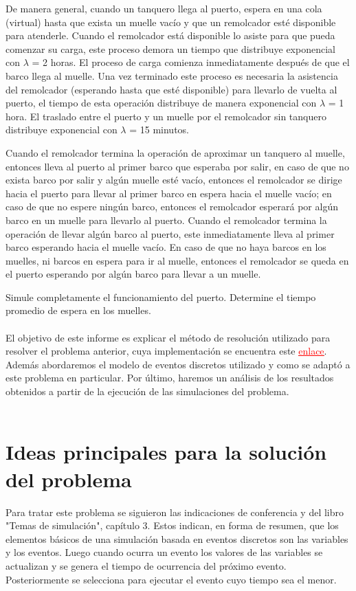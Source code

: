 \documentclass[twoside]{article}
\begin{document}
De manera general, cuando un tanquero llega al puerto, espera en una cola
(virtual) hasta que exista un muelle vac\'io y que un remolcador est\'e disponible
para atenderle. Cuando el remolcador est\'a disponible lo asiste para que pueda
comenzar su carga, este proceso demora un tiempo que distribuye exponencial
con $\lambda$ = 2 horas. El proceso de carga comienza inmediatamente despu\'es de que
el barco llega al muelle. Una vez terminado este proceso es necesaria la asistencia
del remolcador (esperando hasta que est\'e disponible) para llevarlo de vuelta al
puerto, el tiempo de esta operaci\'on distribuye de manera exponencial con $\lambda$ = 1
hora. El traslado entre el puerto y un muelle por el remolcador sin tanquero
distribuye exponencial con $\lambda$ = 15 minutos.

Cuando el remolcador termina la operaci\'on de aproximar un tanquero al
muelle, entonces lleva al puerto al primer barco que esperaba por salir, en caso de
que no exista barco por salir y alg\'un muelle est\'e vac\'io, entonces el remolcador se
dirige hacia el puerto para llevar al primer barco en espera hacia el muelle vac\'io;
en caso de que no espere ning\'un barco, entonces el remolcador esperar\'a por alg\'un barco en un muelle para llevarlo al puerto. Cuando el remolcador termina
la operaci\'on de llevar alg\'un barco al puerto, este inmediatamente lleva al primer
barco esperando hacia el muelle vac\'io. En caso de que no haya barcos en los
muelles, ni barcos en espera para ir al muelle, entonces el remolcador se queda
en el puerto esperando por alg\'un barco para llevar a un muelle.

Simule completamente el funcionamiento del puerto. Determine el tiempo
promedio de espera en los muelles. \\\\

El objetivo de este informe es explicar el m\'etodo de resoluci\'on utilizado para resolver el problema anterior, cuya implementaci\'on se encuentra este \href{https://github.com/Alexx-4/Overloaded-Harbor.git}{\textcolor{red}{\underline{enlace}}}. Adem\'as abordaremos el modelo de eventos discretos utilizado y como se adapt\'o a este problema en particular. Por \'ultimo, haremos un an\'alisis de los resultados obtenidos a partir de la ejecuci\'on de las simulaciones del problema.\\\\

\section{Ideas principales para la soluci\'on del problema}
Para tratar este problema se siguieron las indicaciones de conferencia y del libro "Temas de simulaci\'on", cap\'itulo 3. Estos indican, en forma de resumen, que los elementos b\'asicos de una simulaci\'on basada en eventos discretos son las variables y los eventos. Luego cuando ocurra un evento los valores de las variables se actualizan y se genera el tiempo de ocurrencia del pr\'oximo evento. Posteriormente se selecciona para ejecutar el evento cuyo tiempo sea el menor.\\
\end{document}
